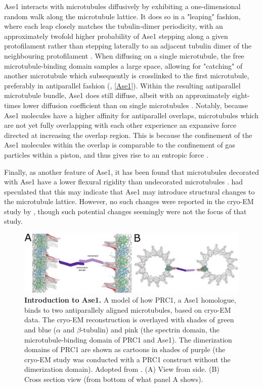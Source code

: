 Ase1 interacts with microtubules diffusively by exhibiting a one-dimensional random walk along the microtubule lattice. It does so in a "leaping" fashion, where each leap closely matches the tubulin-dimer periodicity, with an approximately twofold higher probability of Ase1 stepping along a given protofilament rather than stepping laterally to an adjacent tubulin dimer of the neighbouring protofilament . When diffusing on a single microtubule, the free microtubule-binding domain samples a large space, allowing for "catching" of another microtubule which subsequently is crosslinked to the first microtubule, preferably in antiparallel fashion (\cite{Janson2007}, \autoref{Ase1}). Within the resulting antiparallel microtubule bundle, Ase1 does still diffuse, albeit with an approximately eight-times lower diffusion coefficient than on single microtubules \parencite{lanskydiffusible2015}. Notably, because Ase1 molecules have a higher affinity for antiparallel overlaps, microtubules which are not yet fully overlapping with each other experience an expansive force directed at increasing the overlap region. This is because the confinement of the Ase1 molecules within the overlap is comparable to the confinement of gas particles within a piston, and thus gives rise to an entropic force .\par

Finally, as another feature of Ase1, it has been found that microtubules decorated with Ase1 have a lower flexural rigidity than undecorated microtubules \parencite{Portran2013}. \cite{Portran2013} had speculated that this may indicate that Ase1 may introduce structural changes to the microtubule lattice. However, no such changes were reported in the cryo-EM study by \cite{Kellogg2016}, though such potential changes seemingly were not the focus of that study. 
\begin{figure}[h!tb]
\centering
\includegraphics[width=\linewidth]{Figures/Ase1.png}
\caption[Introduction to Ase1.]{
\textbf{Introduction to Ase1.} A model of how PRC1, a Ase1 homologue, binds to two antiparallely aligned microtubules, based on cryo-EM data. The cryo-EM reconstruction is overlayed with shades of green and blue ($\alpha$ and $\beta$-tubulin) and pink (the spectrin domain, the microtubule-binding domain of PRC1 and Ase1). The dimerization domains of PRC1 are shown as cartoons in shades of purple (the cryo-EM study was conducted with a PRC1 construct without the dimerization domain). Adopted from \cite{Kellogg2016}. (A) View from side. (B) Cross section view (from bottom of what panel A shows). 
	}\label{Ase1}
\end{figure}